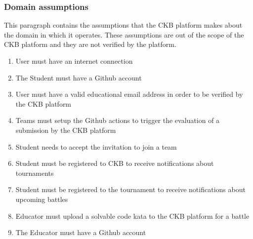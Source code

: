 \subsubsection{Domain assumptions}
This paragraph contains the assumptions that the CKB platform makes about the domain in which it operates. These assumptions are out of the scope of the CKB platform and they are not verified by the platform.

\begin{enumerate}[label=D\arabic*:]
    \item User must have an internet connection
    \item The Student must have a Github account
    \item User must have a valid educational email address in order to be verified by the CKB platform
    \item Teams must setup the Github actions to trigger the evaluation of a submission by the CKB platform
    \item Student needs to accept the invitation to join a team
    \item Student must be registered to CKB to receive notifications about tournaments
    \item Student must be registered to the tournament to receive notifications about upcoming battles
    \item Educator must upload a solvable code kata to the CKB platform for a battle
    \item The Educator must have a Github account
\end{enumerate}